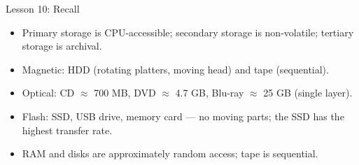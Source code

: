 \documentclass[aspectratio=169]{beamer}
\begin{document}
\begin{frame}{Lesson 10: Recall}
  \begin{itemize}
    \item Primary storage is CPU-accessible; secondary storage is
      non-volatile; tertiary storage is archival.
    \item Magnetic: HDD (rotating platters, moving head) and tape
      (sequential).
    \item Optical: CD $\approx$ 700 MB, DVD $\approx$ 4.7 GB, Blu-ray
      $\approx$ 25 GB (single layer).
    \item Flash: SSD, USB drive, memory card --- no moving parts; the SSD
      has the highest transfer rate.
    \item RAM and disks are approximately random access; tape is sequential.
  \end{itemize}
\end{frame}
\end{document}
